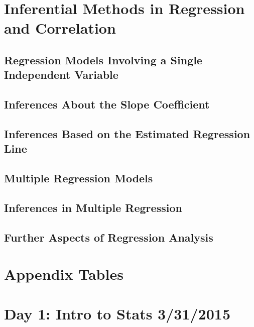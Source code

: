 \documentclass{article}
\begin{document}
\clearpage	
\section{Inferential Methods in Regression and Correlation} %

	\subsection{Regression Models Involving a Single Independent Variable} %
	
	\subsection{Inferences About the Slope Coefficient} %
	
	\subsection{Inferences Based on the Estimated Regression Line} %
	
	\subsection{Multiple Regression Models} %
	
	\subsection{Inferences in Multiple Regression} %
	
	\subsection{Further Aspects of Regression Analysis} %
	
\clearpage
\section{Appendix Tables} %

\iffalse
\section{Day 1: Intro to Stats 3/31/2015}
	
\end{document}
